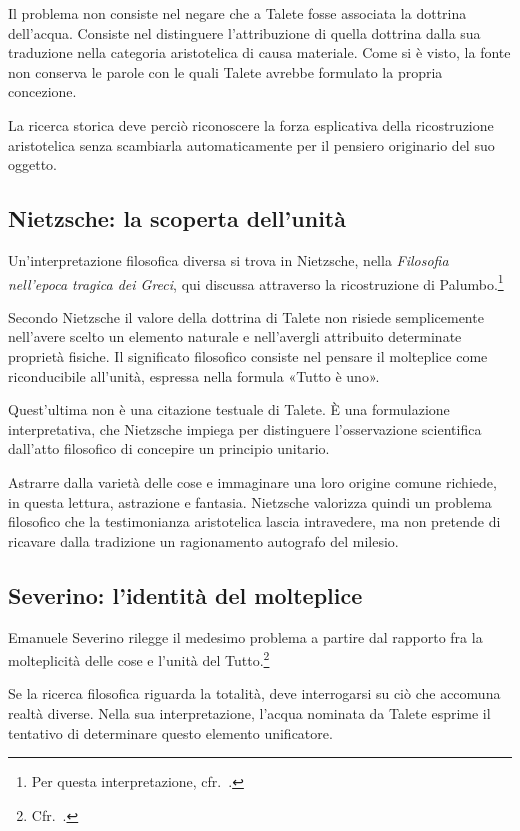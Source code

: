 Il problema non consiste nel negare che a Talete fosse associata la dottrina dell'acqua. Consiste nel distinguere l'attribuzione di quella dottrina dalla sua traduzione nella categoria aristotelica di causa materiale. Come si è visto, la fonte non conserva le parole con le quali Talete avrebbe formulato la propria concezione.

La ricerca storica deve perciò riconoscere la forza esplicativa della ricostruzione aristotelica senza scambiarla automaticamente per il pensiero originario del suo oggetto.

\subsection{Nietzsche: la scoperta dell'unità}

Un'interpretazione filosofica diversa si trova in Nietzsche, nella \emph{Filosofia nell'epoca tragica dei Greci}, qui discussa attraverso la ricostruzione di Palumbo.\footnote{Per questa interpretazione, cfr.\ \cite[19]{palumbo2015}.}

Secondo Nietzsche il valore della dottrina di Talete non risiede semplicemente nell'avere scelto un elemento naturale e nell'avergli attribuito determinate proprietà fisiche. Il significato filosofico consiste nel pensare il molteplice come riconducibile all'unità, espressa nella formula «Tutto è uno».

Quest'ultima non è una citazione testuale di Talete. È una formulazione interpretativa, che Nietzsche impiega per distinguere l'osservazione scientifica dall'atto filosofico di concepire un principio unitario.

Astrarre dalla varietà delle cose e immaginare una loro origine comune richiede, in questa lettura, astrazione e fantasia. Nietzsche valorizza quindi un problema filosofico che la testimonianza aristotelica lascia intravedere, ma non pretende di ricavare dalla tradizione un ragionamento autografo del milesio.

\subsection{Severino: l'identità del molteplice}

Emanuele Severino rilegge il medesimo problema a partire dal rapporto fra la molteplicità delle cose e l'unità del Tutto.\footnote{Cfr.\ \cite[48--50]{severino2010}.}

Se la ricerca filosofica riguarda la totalità, deve interrogarsi su ciò che accomuna realtà diverse. Nella sua interpretazione, l'acqua nominata da Talete esprime il tentativo di determinare questo elemento unificatore.

